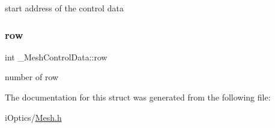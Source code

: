 start address of the control data \mbox{\label{struct___mesh_control_data_a282572be6466c1e1761fb9fa56846741}} 
\subsubsection{\texorpdfstring{row}{row}}
{\footnotesize\ttfamily int \+\_\+\+Mesh\+Control\+Data\+::row}

number of row 

The documentation for this struct was generated from the following file\+:\begin{DoxyCompactItemize}
\item 
i\+Optics/\mbox{\hyperlink{_mesh_8h}{Mesh.\+h}}\end{DoxyCompactItemize}
